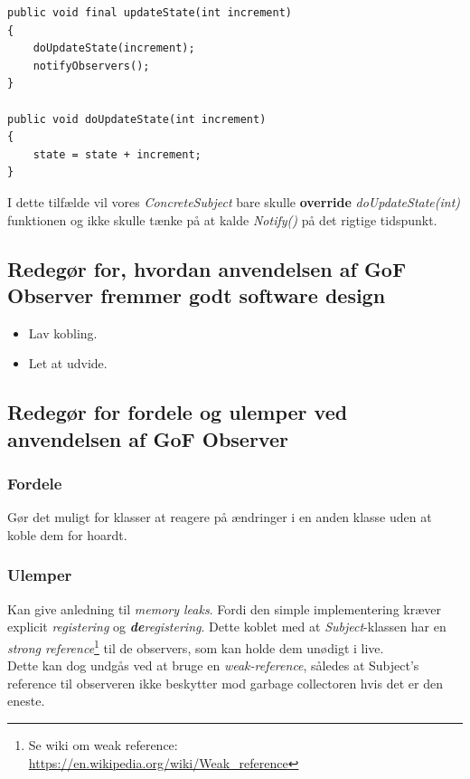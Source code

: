 \begin{lstlisting}
public void final updateState(int increment)
{
	doUpdateState(increment);
	notifyObservers();
}

public void doUpdateState(int increment)
{
	state = state + increment;		
}
\end{lstlisting}

I dette tilfælde vil vores \textit{ConcreteSubject} bare skulle \textbf{override} \textit{doUpdateState(int)} funktionen og ikke skulle tænke på at kalde \textit{Notify()} på det rigtige tidspunkt.

\subsection{Redegør for, hvordan anvendelsen af GoF Observer fremmer godt software design}

\begin{itemize}
	\item Lav kobling.
	\item Let at udvide.
\end{itemize}

\subsection{Redegør for fordele og ulemper ved anvendelsen af GoF Observer}

\subsubsection{Fordele}
Gør det muligt for klasser at reagere på ændringer i en anden klasse uden at koble dem for hoardt.

\subsubsection{Ulemper}
Kan give anledning til \textit{memory leaks}. Fordi den simple implementering kræver explicit \textit{registering} og \textit{\textbf{de}registering}. Dette koblet med at \textit{Subject}-klassen har en \textit{strong reference}\footnote{Se wiki om weak reference:\\ \url{https://en.wikipedia.org/wiki/Weak_reference}} til de observers, som kan holde dem unødigt i live.\\
Dette kan dog undgås ved at bruge en \textit{weak-reference}, således at Subject's reference til observeren ikke beskytter mod garbage collectoren hvis det er den eneste.


